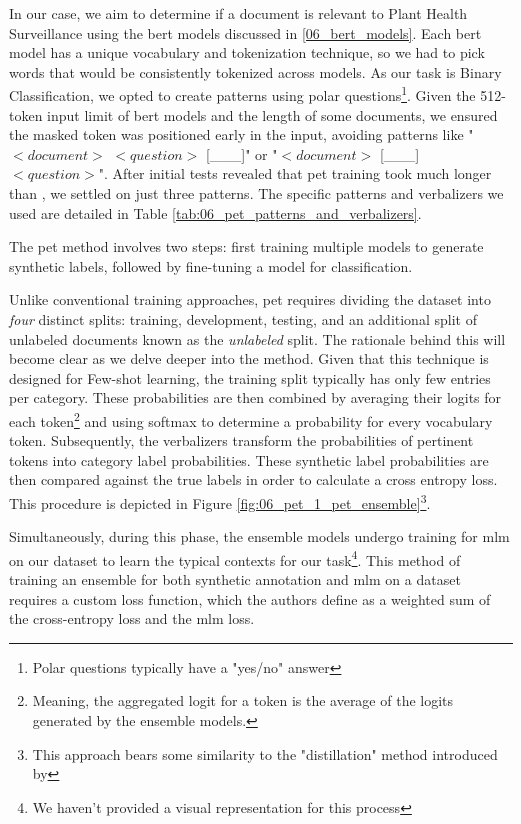 In our case, we aim to determine if a document is relevant to Plant Health Surveillance using the \gls{bert} models discussed in \headerName{} \ref{06_bert_models}. 
Each \gls{bert} model has a unique vocabulary and tokenization technique, so we had to pick words that would be consistently tokenized across models. 
As our task is Binary Classification, we opted to create patterns using polar questions\footnote{Polar questions typically have a "yes/no" answer}.
Given the 512-token input limit of \gls{bert} models and the length of some documents, we ensured the masked token was positioned early in the input, avoiding patterns like "$<document>$ $<question>$ [\_\_\_]" or "$<document>$ [\_\_\_] $<question>$".
After initial tests revealed that \gls{pet} training took much longer than \finetuning{}, we settled on just three patterns. The specific patterns and verbalizers we used are detailed in Table \ref{tab:06_pet_patterns_and_verbalizers}.



The \gls{pet} method involves two steps: first training multiple models to generate synthetic labels, followed by fine-tuning a model for classification.

Unlike conventional training approaches, \gls{pet} requires dividing the dataset into \emph{four} distinct splits: training, development, testing, and an additional split of unlabeled documents known as the \emph{unlabeled} split. The rationale behind this will become clear as we delve deeper into the method. Given that this technique is designed for Few-shot learning, the training split typically has only few entries per category.
These probabilities are then combined by averaging their logits for each token\footnote{Meaning, the aggregated logit for a token is the average of the logits generated by the ensemble models.} and using \gls{softmax} to determine a probability for every vocabulary token.
Subsequently, the verbalizers transform the probabilities of pertinent tokens into category label probabilities. 
These synthetic label probabilities are then compared against the true labels in order to calculate a cross entropy loss.
This procedure is depicted in Figure \ref{fig:06_pet_1_pet_ensemble}\footnote{This approach bears some similarity to the "distillation" method introduced by }.


Simultaneously, during this phase, the ensemble models undergo training for \gls{mlm} on our dataset to learn the typical contexts for our task\footnote{We haven't provided a visual representation for this process}. This method of training an ensemble for both synthetic annotation and \gls{mlm} on a dataset requires a custom loss function, which the authors define as a weighted sum of the cross-entropy loss and the \gls{mlm} loss.

